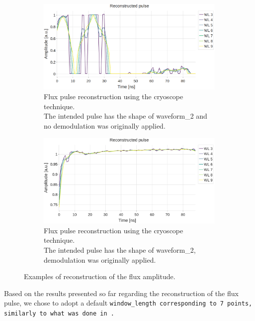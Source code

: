 \begin{figure}[h!]
    \begin{subfigure}[t]{0.495\textwidth}
        \includegraphics[width=\textwidth]{figures/png/Cryoscope/no_demod/long/amplitude_windows.png}
        \caption{Flux pulse reconstruction using the cryoscope technique.\\
        The intended pulse has the shape of waveform\_2 and no demodulation was originally applied.}
        \label{fig:amplitude:long_no_dem}
    \end{subfigure}
    \hfill
    \begin{subfigure}[t]{0.495\textwidth}
        \includegraphics[width=\textwidth]{figures/png/Cryoscope/demodulation/long/amplitude_windows.png}
        \caption{Flux pulse reconstruction using the cryoscope technique.\\
        The intended pulse has the shape of waveform\_2, demodulation was originally applied.}
        \label{fig:amplitude:long_dem}
    \end{subfigure}

    \caption{Examples of reconstruction of the flux amplitude.}
    \label{fig:amplitude}
\end{figure}

Based on the results presented so far regarding the reconstruction of the flux pulse, we chose to adopt a default \tt{window\_length} corresponding to 7 points, similarly to what was done in \cite{rol_time-domain_2020}.

